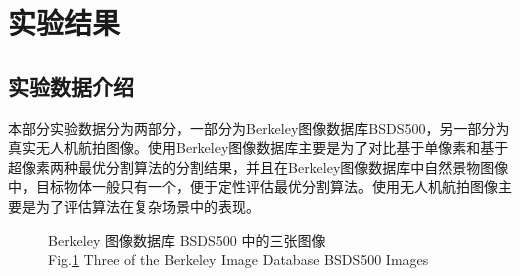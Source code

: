 \section{实验结果}
\subsection{实验数据介绍}


本部分实验数据分为两部分，一部分为Berkeley图像数据库BSDS500，另一部分为真实无人机航拍图像。使用Berkeley图像数据库主要是为了对比基于单像素和基于超像素两种最优分割算法的分割结果，并且在Berkeley图像数据库中自然景物图像中，目标物体一般只有一个，便于定性评估最优分割算法。使用无人机航拍图像主要是为了评估算法在复杂场景中的表现。

\begin{figure}[H]
\centering
    \captionsetup{justification=centering}
    \caption{Berkeley 图像数据库 BSDS500 中的三张图像 \\ Fig.\ref{Berkeley图像数据库BSDS500中的三张图像} Three of the Berkeley Image Database BSDS500 Images}\label{Berkeley图像数据库BSDS500中的三张图像}
\end{figure}



